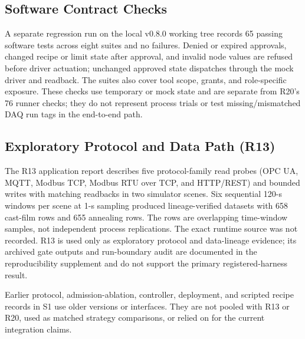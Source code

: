 \subsection{Software Contract Checks}
A separate regression run on the local v0.8.0 working tree records 65 passing
software tests across eight suites and no failures. Denied or expired
approvals, changed recipe or limit state after approval, and invalid node
values are refused before driver actuation; unchanged approved state dispatches
through the mock driver and readback. The suites also cover tool scope, grants,
and role-specific exposure. These checks use temporary or mock state and are
separate from R20's 76 runner checks; they do not represent process trials or
test missing/mismatched DAQ run tags in the end-to-end path.

\subsection{Exploratory Protocol and Data Path (R13)}
\label{sec:crossscene}
The R13 application report describes five protocol-family read probes (OPC UA,
MQTT, Modbus TCP, Modbus RTU over TCP, and HTTP/REST) and bounded writes with
matching readbacks in two simulator scenes. Six sequential 120-s windows per
scene at 1-s sampling produced lineage-verified datasets with 658 cast-film
rows and 655 annealing rows. The rows are overlapping time-window samples, not
independent process replications. The exact runtime source was not recorded. R13 is
used only as exploratory protocol and data-lineage evidence; its archived gate
outputs and run-boundary audit are documented in the reproducibility
supplement and do not support the primary registered-harness result.

Earlier protocol, admission-ablation, controller, deployment, and scripted
recipe records in S1 use older versions or interfaces. They are not pooled
with R13 or R20, used as matched strategy comparisons, or relied on for the
current integration claims.
